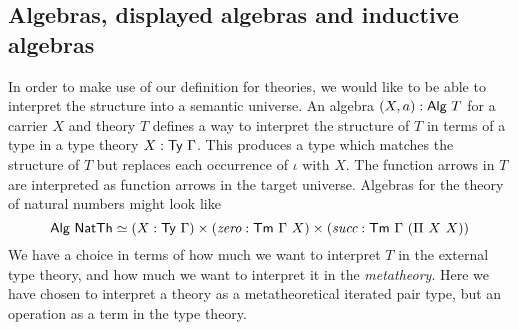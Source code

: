 \subsection{Algebras, displayed algebras and inductive algebras} \label{sub:algebras}

In order to make use of our definition for theories, we would like to be able to interpret
the structure into a semantic universe. An algebra $(X, a) : \textsf{Alg}\ T$
for a carrier $X$ and theory $T$ defines a way to interpret the structure of $T$
in terms of a type in a type theory $X : \textsf{Ty}\ \Gamma$. This produces a type which
matches the structure of $T$ but replaces each occurrence of $\iota$ with $X$.
The function arrows in $T$ are interpreted as function arrows in the target universe.
Algebras for the theory of natural numbers might look like
\[
	\mta{Alg}\ \mta{NatTh}\simeq (X : \Ty\ \Gamma) \times (\textit{zero} : \Tm\ \Gamma\ X) \times (\textit{succ} : \Tm\ \Gamma\ (\Pi\ X\ X))
\]
We have a choice in terms of how much we want to interpret $T$ in the external type theory,
and how much we want to interpret it in the \emph{metatheory}. Here we have chosen to interpret
a theory as a metatheoretical iterated pair type, but an operation as a term in the type theory.

